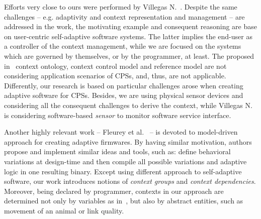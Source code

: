 Efforts very close to ours were performed by Villegas N.~\cite{VilegasPhD11}.
Despite the same challenges -- e.g. adaptivity and context representation and
management -- are addressed in the work, the motivating example and consequent
reasoning are base on user-centric self-adaptive software systems. The latter
implies the end-user as a controller of the context management, while we are
focused on the systems which are governed by themselves, or by the programmer,
at least. The proposed in~\cite{VilegasPhD11} context ontology, context control
model and reference model are not considering application scenarios of CPSs,
and, thus, are not applicable. Differently, our research is based on particular
challenges arose when creating adaptive software for CPSs. Besides, we are using
physical sensor devices and considering all the consequent challenges to derive
the context, while Villegas N.~\cite{VilegasPhD11} is considering software-based
\emph{sensor} to monitor software service interface.

Another highly relevant work -- Fleurey et
al.~\cite{Fleureya-adaptive-firmwares11} -- is devoted to model-driven approach
for creating adaptive firmwares. By having similar motivation, authors propose
and implement similar ideas and tools, such as: define behavioral variations at
design-time and then compile all possible variations and adaptive logic in one
resulting binary. Except using different approach to self-adaptive software, our
work introduces notions of \emph{context groups} and \emph{context
dependencies}. Moreover, being declared by programmer, contexts in our approach
are determined not only by variables as in~\cite{Fleureya-adaptive-firmwares11}, but also by abstract entities, such as
movement of an animal or link quality.




